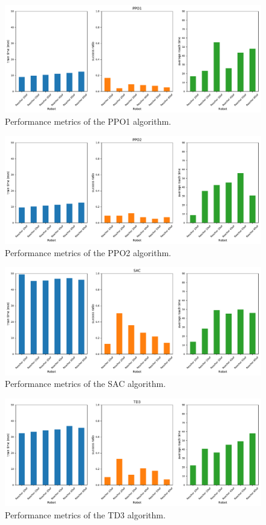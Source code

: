 \documentclass{article}
\begin{document}
\begin{figure}[H]
    \centering
    \includegraphics[width=\textwidth]{../PPO1.pdf}
\caption{Performance metrics of the PPO1 algorithm.}
\end{figure}

\begin{figure}[H]
    \centering
    \includegraphics[width=\textwidth]{../PPO2.pdf}
\caption{Performance metrics of the PPO2 algorithm.}
\end{figure}

\begin{figure}[H]
    \centering
    \includegraphics[width=\textwidth]{../SAC.pdf}
\caption{Performance metrics of the SAC algorithm.}
\end{figure}

\begin{figure}[H]
    \centering
    \includegraphics[width=\textwidth]{../TD3.pdf}
\caption{Performance metrics of the TD3 algorithm.}
\end{figure}
\end{document}
